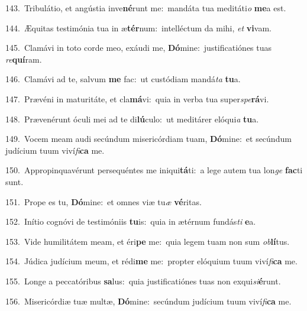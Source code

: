 {\numbfont\textcolor{\numbcolor}{143.}}~Tribulátio, et angústia inve\-\textbf{né}\-runt me:~\star mandáta tua meditáti\textit{o} \textbf{me}\-a est.\par
{\numbfont\textcolor{\numbcolor}{144.}}~Æquitas testimónia tua in æ\-\textbf{tér}\-num:~\star intelléctum da mihi, \textit{et} \textbf{vi}\-vam.\par
{\numbfont\textcolor{\numbcolor}{145.}}~Clamávi in toto corde meo, exáudi me, \textbf{Dó}\-mine:~\star justificatiónes tuas \textit{re}\-\textbf{quí}ram.\par
{\numbfont\textcolor{\numbcolor}{146.}}~Clamávi ad te, salvum \textbf{me} fac:~\star ut custódiam mandá\textit{ta} \textbf{tu}\-a.\par
{\numbfont\textcolor{\numbcolor}{147.}}~Prævéni in maturitáte, et cla\-\textbf{má}\-vi:~\star quia in verba tua super\-\textit{spe}\-\textbf{rá}vi.\par
{\numbfont\textcolor{\numbcolor}{148.}}~Prævenérunt óculi mei ad te di\-\textbf{lú}\-culo:~\star ut meditárer elóqui\textit{a} \textbf{tu}\-a.\par
{\numbfont\textcolor{\numbcolor}{149.}}~Vocem meam audi secúndum misericórdiam tuam, \textbf{Dó}\-mine:~\star et secúndum judícium tuum viví\-\textit{fi}\-\textbf{ca} me.\par
{\numbfont\textcolor{\numbcolor}{150.}}~Appropinquavérunt persequéntes me iniqui\-\textbf{tá}\-ti:~\star a lege autem tua lon\textit{ge} \textbf{fac}\-ti sunt.\par
{\numbfont\textcolor{\numbcolor}{151.}}~Prope es tu, \textbf{Dó}\-mine:~\star et omnes viæ tu\textit{æ} \textbf{vé}\-ritas.\par
{\numbfont\textcolor{\numbcolor}{152.}}~Inítio cognóvi de testimóniis \textbf{tu}\-is:~\star quia in ætérnum fundás\textit{ti} \textbf{e}\-a.\par
{\numbfont\textcolor{\numbcolor}{153.}}~Vide humilitátem meam, et éri\textbf{pe} me:~\star quia legem tuam non sum \textit{ob}\-\textbf{lí}tus.\par
{\numbfont\textcolor{\numbcolor}{154.}}~Júdica judícium meum, et rédi\textbf{me} me:~\star propter elóquium tuum viví\-\textit{fi}\-\textbf{ca} me.\par
{\numbfont\textcolor{\numbcolor}{155.}}~Longe a peccatóribus \textbf{sa}\-lus:~\star quia justificatiónes tuas non exqui\-\textit{si}\-\textbf{é}runt.\par
{\numbfont\textcolor{\numbcolor}{156.}}~Misericórdiæ tuæ multæ, \textbf{Dó}\-mine:~\star secúndum judícium tuum viví\-\textit{fi}\-\textbf{ca} me.\par
